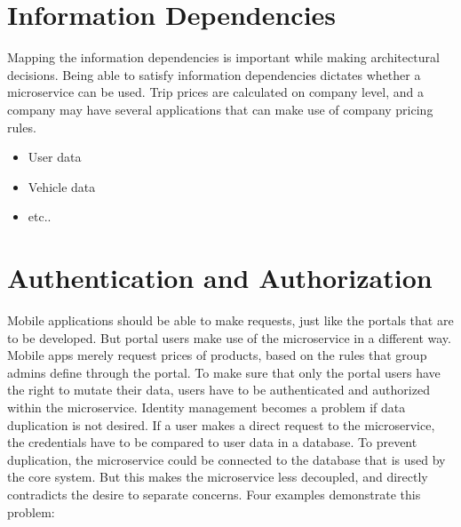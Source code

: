 %
\section{Information Dependencies}





Mapping the information dependencies is important while making architectural decisions. Being able to satisfy information dependencies dictates whether a microservice can be used. Trip prices are calculated on company level, and a company may have several applications that can make use of company pricing rules.

\begin{itemize}
	\item User data
	\item Vehicle data
	\item etc..
\end{itemize}

%
\section{Authentication and Authorization}
Mobile applications should be able to make requests, just like the portals that are to be developed. But portal users make use of the microservice in a different way. Mobile apps merely request prices of products, based on the rules that group admins define through the portal. To make sure that only the portal users have the right to mutate their data, users have to be authenticated and authorized within the microservice. Identity management becomes a problem if data duplication is not desired. If a user makes a direct request to the microservice, the credentials have to be compared to user data in a database. To prevent duplication, the microservice could be connected to the database that is used by the core system. But this makes the microservice less decoupled, and directly contradicts the desire to separate concerns. Four examples demonstrate this problem:

